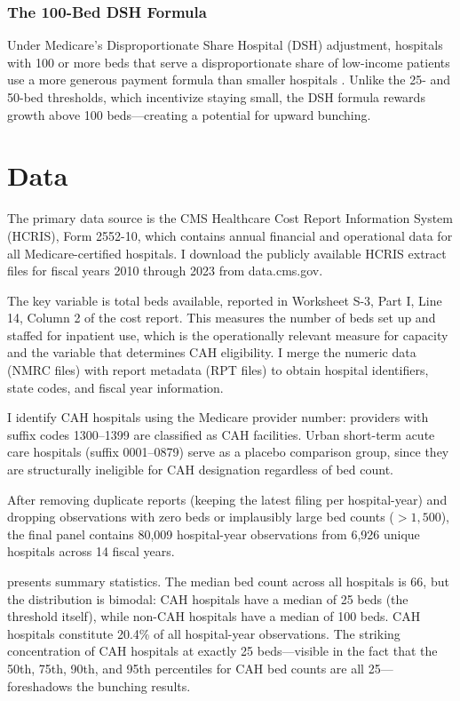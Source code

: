\documentclass[12pt]{article}
\begin{document}
\subsubsection*{The 100-Bed DSH Formula} Under Medicare's Disproportionate Share Hospital (DSH) adjustment, hospitals with 100 or more beds that serve a disproportionate share of low-income patients use a more generous payment formula than smaller hospitals \citep{MedPAC2019}. Unlike the 25- and 50-bed thresholds, which incentivize staying small, the DSH formula rewards growth above 100 beds---creating a potential for upward bunching.

\section{Data}

The primary data source is the CMS Healthcare Cost Report Information System (HCRIS), Form 2552-10, which contains annual financial and operational data for all Medicare-certified hospitals. I download the publicly available HCRIS extract files for fiscal years 2010 through 2023 from data.cms.gov.

The key variable is total beds available, reported in Worksheet S-3, Part I, Line 14, Column 2 of the cost report. This measures the number of beds set up and staffed for inpatient use, which is the operationally relevant measure for capacity and the variable that determines CAH eligibility. I merge the numeric data (NMRC files) with report metadata (RPT files) to obtain hospital identifiers, state codes, and fiscal year information.

I identify CAH hospitals using the Medicare provider number: providers with suffix codes 1300--1399 are classified as CAH facilities. Urban short-term acute care hospitals (suffix 0001--0879) serve as a placebo comparison group, since they are structurally ineligible for CAH designation regardless of bed count.

After removing duplicate reports (keeping the latest filing per hospital-year) and dropping observations with zero beds or implausibly large bed counts ($> 1{,}500$), the final panel contains 80,009 hospital-year observations from 6,926 unique hospitals across 14 fiscal years.



 presents summary statistics. The median bed count across all hospitals is 66, but the distribution is bimodal: CAH hospitals have a median of 25 beds (the threshold itself), while non-CAH hospitals have a median of 100 beds. CAH hospitals constitute 20.4\% of all hospital-year observations. The striking concentration of CAH hospitals at exactly 25 beds---visible in the fact that the 50th, 75th, 90th, and 95th percentiles for CAH bed counts are all 25---foreshadows the bunching results.
\end{document}
